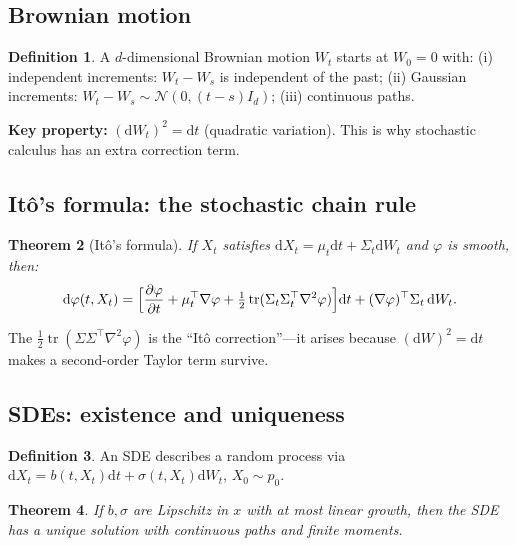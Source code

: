 \documentclass[11pt,letterpaper]{article}
\theoremstyle{plain}
\newtheorem{theorem}{Theorem}[section]
\theoremstyle{definition}
\newtheorem{definition}[theorem]{Definition}
\theoremstyle{remark}
\newcommand{\dd}{\mathrm{d}}
\newcommand{\calN}{\mathcal{N}}
\newcommand{\tr}{\operatorname{tr}}
\newcommand{\grad}{\nabla}
\begin{document}
\begin{advancedmath}

\subsection{Brownian motion}

\begin{definition}
A $d$-dimensional Brownian motion $W_t$ starts at $W_0=0$ with:
(i) independent increments: $W_t-W_s$ is independent of the past;
(ii) Gaussian increments: $W_t-W_s\sim\calN(0,(t-s)I_d)$;
(iii) continuous paths.
\end{definition}

\textbf{Key property:} $(\dd W_t)^2=\dd t$ (quadratic variation). This
is why stochastic calculus has an extra correction term.

\subsection{It\^o's formula: the stochastic chain rule}

\begin{theorem}[It\^o's formula]\label{thm:ito}
If $X_t$ satisfies $\dd X_t=\mu_t\dd t+\Sigma_t\dd W_t$ and $\varphi$
is smooth, then:
\begin{equation}
  \dd\varphi(t,X_t)
  = \Bigl[\frac{\partial\varphi}{\partial t}
    + \mu_t^\top\grad\varphi
    + \tfrac{1}{2}\tr(\Sigma_t\Sigma_t^\top\nabla^2\varphi)\Bigr]\dd t
  + (\grad\varphi)^\top\Sigma_t\,\dd W_t.
  \label{eq:ito-formula}
\end{equation}
\end{theorem}

The $\frac{1}{2}\tr(\Sigma\Sigma^\top\nabla^2\varphi)$ is the ``It\^o
correction''---it arises because $(\dd W)^2=\dd t$ makes a second-order
Taylor term survive.

\subsection{SDEs: existence and uniqueness}

\begin{definition}
An SDE describes a random process via
$\dd X_t = b(t,X_t)\dd t + \sigma(t,X_t)\dd W_t$, $X_0\sim p_0$.
\end{definition}

\begin{theorem}
If $b,\sigma$ are Lipschitz in $x$ with at most linear growth, then the
SDE has a unique solution with continuous paths and finite moments.
\end{theorem}


\end{advancedmath}
\end{document}
